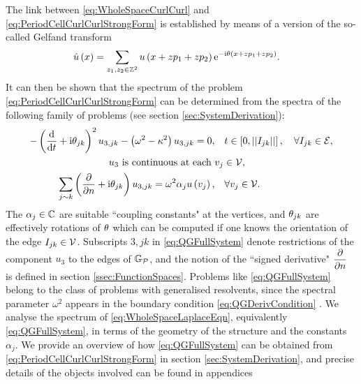 The link between \eqref{eq:WholeSpaceCurlCurl} and \eqref{eq:PeriodCellCurlCurlStrongForm} is established by means of a version of the so-called Gelfand transform \cite{gelfand1950expansion}
\begin{align*}
	\hat{u}\left( x \right) &= \sum_{z_1,z_2\in\mathbb{Z}^2}u\left( x+zp_1+zp_2 \right)\mathrm{e}^{-\mathrm{i}\theta\left( x+zp_1+zp_2 \right)}.
\end{align*}
It can then be shown that the spectrum of the problem \eqref{eq:PeriodCellCurlCurlStrongForm} can be determined from the spectra of the following family of problems (see section \ref{sec:SystemDerivation}):
\begin{subequations} \label{eq:QGFullSystem}
	\begin{align}
		- \left(  \dfrac{\mathrm{d}}{\mathrm{d}t} + \mathrm{i}\theta_{jk}  \right)^2 u_{3,jk} - \left( \omega^2-\kappa^2 \right)u_{3,jk} = 0, &\quad t\in\left[ 0,\left\lvert \left\lvert I_{jk} \right\rvert \right\rvert \right], \quad\forall I_{jk}\in\mathcal{E}, \\
		u_3 \text{ is continuous at each } & v_j\in\mathcal{V}, \\
		\sum_{j\sim k}\left(  \dfrac{\partial }{\partial n} + \mathrm{i}\theta_{jk}  \right)u_{3,jk} = \omega^2\alpha_j u\left( v_j \right), &\quad\forall v_j\in\mathcal{V}.
	\end{align}
\end{subequations}
The $\alpha_j\in\mathbb{C}$ are suitable ``coupling constants" at the vertices, and $\theta_{jk}$ are effectively rotations of $\theta$ which can be computed if one knows the orientation of the edge $I_{jk}\in\mathcal{V}$.
Subscripts $3,jk$ in \eqref{eq:QGFullSystem} denote restrictions of the component $u_3$ to the edges of $\mathbb{G}_{\mathcal{P}}$, and the notion of the ``signed derivative" $\dfrac{\partial }{\partial n}$ is defined in section \ref{ssec:FunctionSpaces}.
Problems like \eqref{eq:QGFullSystem} belong to the class of problems with generalised resolvents, since the spectral parameter $\omega^2$ appears in the boundary condition \eqref{eq:QGDerivCondition} \cite{strauss1954generalized, strauss1968extensions, strauss1998functional, cherednichenko2018effective}.
We analyse the spectrum of \eqref{eq:WholeSpaceLaplaceEqn}, equivalently \eqref{eq:QGFullSystem}, in terms of the geometry of the structure and the constants $\alpha_j$.
We provide an overview of how \eqref{eq:QGFullSystem} can be obtained from \eqref{eq:PeriodCellCurlCurlStrongForm} in section \ref{sec:SystemDerivation}, and precise details of the objects involved can be found in appendices 